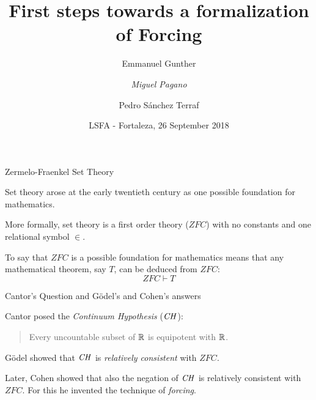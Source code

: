\documentclass{beamer}
\title{First steps towards a formalization of Forcing}
\author{Emmanuel Gunther\and \emph{Miguel Pagano}\and Pedro Sánchez Terraf}
\date{LSFA - Fortaleza, 26 September 2018}
\begin{document}
\maketitle
% 

\begin{frame}{Zermelo-Fraenkel Set Theory}
  \begin{block}{}
    Set theory arose at the early twentieth century as one
    possible foundation for mathematics.
  \end{block}
  \begin{block}{}
    More formally, set theory is a first order theory ($ZFC$) with no
    constants and one relational symbol $\in$. %
  \end{block}
  \begin{block}{}
    To say that $ZFC$ is a possible foundation for mathematics means
    that any mathematical theorem, say $T$, can be deduced from $ZFC$:
    \[ ZFC \vdash T \]
  \end{block}
\end{frame}
\begin{frame}{Cantor's Question and Gödel's and Cohen's answers}
  \begin{block}{}
    Cantor posed the \emph{Continuum Hypothesis} ($\mathit{CH}$):
    \begin{quote}
      Every uncountable subset of $\mathbb{R}$ is equipotent with $\mathbb{R}$.
    \end{quote}
  \end{block}
  \begin{block}{}
    Gödel showed that $\mathit{CH}$ is \emph{relatively consistent} with $ZFC$.
  \end{block}
  \begin{block}{}
    Later, Cohen showed that also the negation of $\mathit{CH}$ is relatively
    consistent with $ZFC$. For this he invented the technique of
    \emph{forcing}.
  \end{block}
\end{frame}
\end{document}
